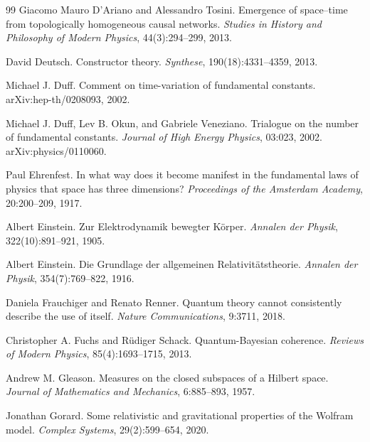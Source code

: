 \documentclass[11pt,a4paper]{article}
\theoremstyle{remark}\newtheorem{remark}[definition]{Remark}
\begin{document}
\begin{thebibliography}{99}
Giacomo Mauro D'Ariano and Alessandro Tosini.
\newblock Emergence of space--time from topologically homogeneous causal networks.
\newblock \emph{Studies in History and Philosophy of Modern Physics}, 44(3):294--299, 2013.

David Deutsch.
\newblock Constructor theory.
\newblock \emph{Synthese}, 190(18):4331--4359, 2013.

Michael J. Duff.
\newblock Comment on time-variation of fundamental constants.
\newblock arXiv:hep-th/0208093, 2002.

Michael J. Duff, Lev B. Okun, and Gabriele Veneziano.
\newblock Trialogue on the number of fundamental constants.
\newblock \emph{Journal of High Energy Physics}, 03:023, 2002. arXiv:physics/0110060.

Paul Ehrenfest.
\newblock In what way does it become manifest in the fundamental laws of physics that space has three dimensions?
\newblock \emph{Proceedings of the Amsterdam Academy}, 20:200--209, 1917.

Albert Einstein.
\newblock Zur Elektrodynamik bewegter K\"orper.
\newblock \emph{Annalen der Physik}, 322(10):891--921, 1905.

Albert Einstein.
\newblock Die Grundlage der allgemeinen Relativit\"atstheorie.
\newblock \emph{Annalen der Physik}, 354(7):769--822, 1916.

Daniela Frauchiger and Renato Renner.
\newblock Quantum theory cannot consistently describe the use of itself.
\newblock \emph{Nature Communications}, 9:3711, 2018.

Christopher A. Fuchs and R\"udiger Schack.
\newblock Quantum-Bayesian coherence.
\newblock \emph{Reviews of Modern Physics}, 85(4):1693--1715, 2013.

Andrew M. Gleason.
\newblock Measures on the closed subspaces of a Hilbert space.
\newblock \emph{Journal of Mathematics and Mechanics}, 6:885--893, 1957.

Jonathan Gorard.
\newblock Some relativistic and gravitational properties of the Wolfram model.
\newblock \emph{Complex Systems}, 29(2):599--654, 2020.


\end{thebibliography}
\end{document}
